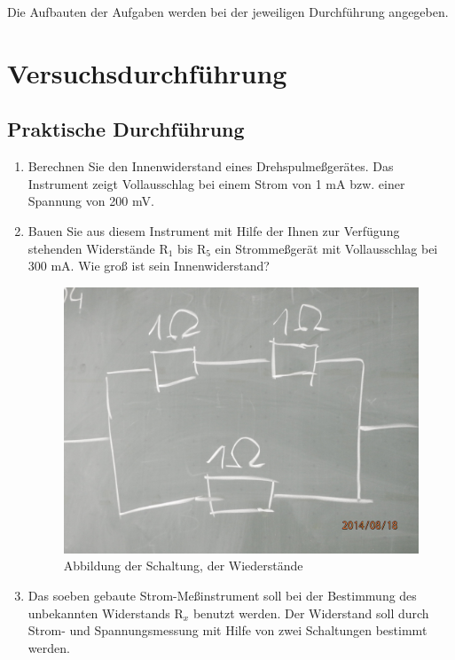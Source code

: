 \documentclass[12pt]{scrartcl}
\begin{document}
Die Aufbauten der Aufgaben werden bei der jeweiligen Durchführung angegeben.

\section{Versuchsdurchführung}


\subsection{Praktische Durchführung}

\begin{enumerate}

	\item 
	Berechnen Sie den Innenwiderstand 				eines Drehspulmeßgerätes. Das Instrument
	zeigt Vollausschlag bei einem Strom von 			1 mA bzw. einer Spannung von 200 mV.
	\item
	Bauen Sie aus diesem Instrument mit 				Hilfe der Ihnen zur Verfügung stehenden 			Widerstände $\text{R}_1$ bis 					$\text{R}_5$ ein 								Strommeßgerät mit Vollausschlag bei 300 			mA. Wie groß ist sein Innenwiderstand?
	\begin{figure}[htbp] 
	  \centering
	    \includegraphics[scale = 0.1]{tafel_1.JPG}
	  	\caption[Abbildung der Schaltung, der Wiederstände]{Abbildung der Schaltung, der Wiederstände}
	  \label{fig:tafel_1}
	\end{figure}
		
	
	\item
	Das soeben gebaute Strom-Meßinstrument 			soll bei der Bestimmung des unbekannten 			Widerstands $\text{R}_x$ benutzt werden. 	Der Widerstand soll durch Strom- und 			Spannungsmessung mit Hilfe von zwei 				Schaltungen bestimmt werden.
	

\end{enumerate}
\end{document}

